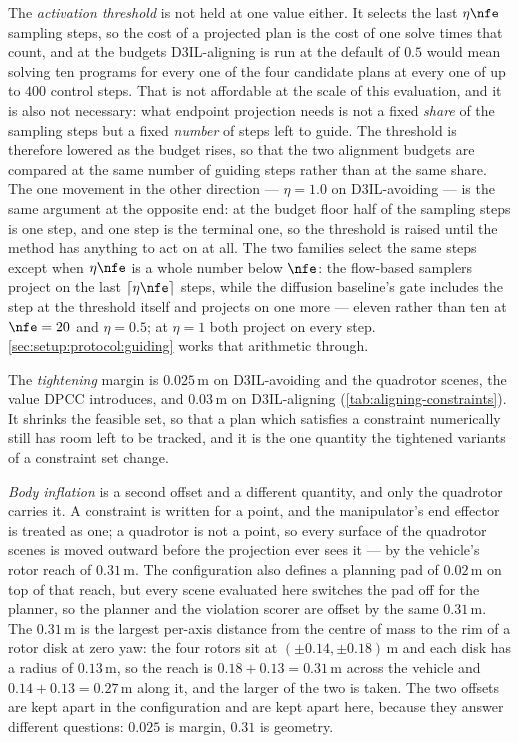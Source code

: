 The \emph{activation threshold} is not held at one value either. It selects the last $\eta\nfe$ sampling
steps, so the cost of a projected plan is the cost of one solve times that count, and at the budgets
D3IL-aligning is run at the default of $0.5$ would mean solving ten programs for every one of the four
candidate plans at every one of up to $400$ control steps. That is not affordable at the scale of this
evaluation, and it is also not necessary: what endpoint projection needs is not a fixed \emph{share} of
the sampling steps but a fixed \emph{number} of steps left to guide. The threshold is therefore lowered as
the budget rises, so that the two alignment budgets are compared at the same number of guiding steps
rather than at the same share. The one movement in the other direction --- $\eta=1.0$ on D3IL-avoiding ---
is the same argument at the opposite end: at the budget floor half of the sampling steps is one step, and
one step is the terminal one, so the threshold is raised until the method has anything to act on at all.
The two families select the same steps except when $\eta\nfe$ is a whole number below $\nfe$: the
flow-based samplers project on the last $\lceil\eta\nfe\rceil$ steps, while the diffusion baseline's gate
includes the step at the threshold itself and projects on one more --- eleven rather than ten at $\nfe=20$
and $\eta=0.5$; at $\eta=1$ both project on every step.
\autoref{sec:setup:protocol:guiding} works that arithmetic through.

The \emph{tightening} margin is $0.025$\,m on D3IL-avoiding and the quadrotor scenes, the value \ac{DPCC}
introduces, and $0.03$\,m on D3IL-aligning (\autoref{tab:aligning-constraints}). It
shrinks the feasible set, so that a plan which satisfies a constraint numerically still has room left to be
tracked, and it is the one quantity the tightened variants of a constraint set change.

\emph{Body inflation} is a second offset and a different quantity, and only the quadrotor carries it. A
constraint is written for a point, and the manipulator's end effector is treated as one; a quadrotor is
not a point, so every surface of the quadrotor scenes is moved outward before the projection ever sees it
--- by the vehicle's rotor reach of $0.31$\,m. The configuration also defines a planning pad of $0.02$\,m
on top of that reach, but every scene evaluated here switches the pad off for the planner, so the planner
and the violation scorer are offset by the same $0.31$\,m. The $0.31$\,m is the
largest per-axis distance from the centre of mass to the rim of a rotor disk at zero yaw: the four rotors
sit at $(\pm 0.14, \pm 0.18)$\,m and each disk has a radius of $0.13$\,m, so the reach is
$0.18+0.13=0.31$\,m across the vehicle and $0.14+0.13=0.27$\,m along it, and the larger of the two is
taken. The two offsets are kept apart in the configuration and are kept apart here, because they answer
different questions: $0.025$ is margin, $0.31$ is geometry.

